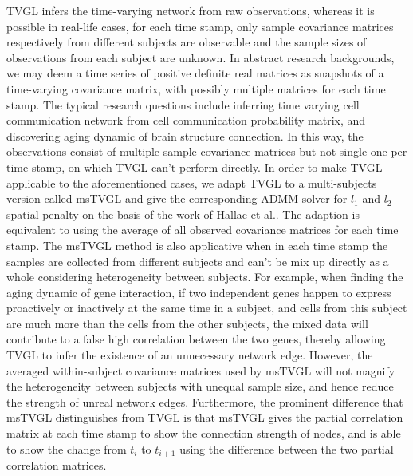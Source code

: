 TVGL infers the time-varying network from raw observations, 
whereas it is possible in real-life cases, for each time stamp, 
only sample covariance matrices respectively from different subjects are observable and the sample sizes of observations from each subject are unknown.
In abstract research backgrounds, we may deem a time series of positive definite real matrices as snapshots of a time-varying covariance matrix, 
with possibly multiple matrices for each time stamp. 
The typical research questions include inferring time varying cell communication network from cell communication probability matrix, 
and discovering aging dynamic of brain structure connection. 
In this way, the observations consist of multiple sample covariance matrices but not single one per time stamp, 
on which TVGL can't perform directly.
In order to make TVGL applicable to the aforementioned cases, 
we adapt TVGL to a multi-subjects version called msTVGL and give the corresponding ADMM solver for $l_1$ and $l_2$ spatial penalty on the basis of the work of Hallac et al.. 
The adaption is equivalent to using the average of all observed covariance matrices for each time stamp. 
The msTVGL method is also applicative when in each time stamp the samples are collected from different subjects 
and can't be mix up directly as a whole considering heterogeneity between subjects. 
For example, when finding the aging dynamic of gene interaction, 
if two independent genes happen to express proactively or inactively at the same time in a subject, 
and cells from this subject are much more than the cells from the other subjects, 
the mixed data will contribute to a false high correlation between the two genes, 
thereby allowing TVGL to infer the existence of an unnecessary network edge.
However, the averaged within-subject covariance matrices used by msTVGL will not magnify the heterogeneity between subjects with unequal sample size, 
and hence reduce the strength of unreal network edges. 
Furthermore, the prominent difference that msTVGL distinguishes from TVGL is that 
msTVGL gives the partial correlation matrix at each time stamp to show the connection strength of nodes, 
and is able to show the change from $t_i$ to $t_{i+1}$
using the difference between the two partial correlation matrices. 

